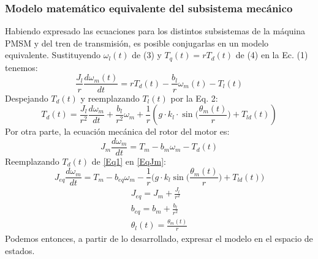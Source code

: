 \documentclass[12pt, a4paper,journal, onecolumn, compsoc]{IEEEtran}
\begin{document}
    \subsubsection{Modelo matemático equivalente del subsistema mecánico}
    Habiendo expresado las ecuaciones para los distintos subsistemas de la máquina PMSM y del tren de transmisión, es posible conjugarlas en un modelo equivalente.
    Sustituyendo \(\omega_l(t)\) de (3) y \(T_q(t) = rT_d(t)\) de (4) en la Ec. (1) tenemos:
    \begin{equation}\label{EqAux1}
        \frac{J_l}{r}\frac{d\omega_m(t)}{dt} = rT_d(t)-\frac{b_l}{r}\omega_m(t)-T_l(t)
    \end{equation}
    Despejando \(T_d(t)\) y reemplazando \(T_l(t)\) por la Eq. 2:
    \begin{equation}\label{Eq1}
        T_d(t)=\frac{J_l}{r^2}\frac{d\omega_m}{dt}+\frac{b_l}{r^2}\omega_m+\frac{1}{r}\left(g\cdot k_l\cdot \sin\Big(\frac{\theta_m(t)}{r}\Big)+T_{ld}(t)\right)
    \end{equation}
    Por otra parte, la ecuación mecánica del rotor del motor es:
    \begin{equation}\label{EqJm}
        J_m\frac{d\omega_m}{dt}=T_m-b_m\omega_m-T_d(t)
    \end{equation}
    Reemplazando \(T_d(t)\) de \eqref{Eq1} en  \eqref{EqJm}:
    \begin{equation}
        J_{eq}\frac{d\omega_m}{dt}=T_m-b_{eq}\omega_m-\frac{1}{r}\Big(g\cdot k_l \sin{\Big(\frac{\theta_m(t)}{r}\Big)} + T_{ld}(t)\Big)
    \end{equation}
    \begin{gather}
        J_{eq} = J_m +\frac{J_l}{r^2}\\
        b_{eq} = b_m + \frac{b_l}{r^2}\\
        \theta_l(t)=\frac{\theta_m(t)}{r}
    \end{gather}
    Podemos entonces, a partir de lo desarrollado, expresar el modelo en el espacio de estados.
\end{document}

